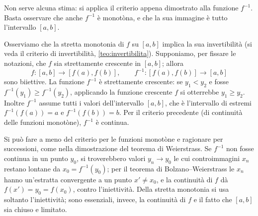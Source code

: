 \begin{strategia}
Non serve alcuna stima: si applica il criterio appena dimostrato alla funzione $f^{-1}$.
Basta osservare che anche $f^{-1}$ è monotòna, e che la sua immagine è tutto
l'intervallo $[a,b]$.
\end{strategia}

\begin{dimostrazione}
Osserviamo che la stretta monotonia di $f$ su $[a,b]$ implica la sua invertibilità (si
veda il criterio di invertibilità, \cref{teo:invertibilita}). Supponiamo, per fissare le
notazioni, che $f$ sia strettamente crescente in $[a,b]$; allora
\begin{equation}\label{eq:inversa-domini}
  f:[a,b]\to[f(a),f(b)], \qquad f^{-1}:[f(a),f(b)]\to[a,b]
\end{equation}
sono biiettive. La funzione $f^{-1}$ è strettamente crescente: se $y_{1}<y_{2}$ e fosse
$f^{-1}(y_{1})\ge f^{-1}(y_{2})$, applicando la funzione crescente $f$ si otterrebbe
$y_{1}\ge y_{2}$. Inoltre $f^{-1}$ assume tutti i valori dell'intervallo $[a,b]$, che è
l'intervallo di estremi $f^{-1}(f(a))=a$ e $f^{-1}(f(b))=b$. Per il criterio precedente
(di continuità delle funzioni monotòne), $f^{-1}$ è continua.
\end{dimostrazione}

\begin{strategia}
Si può fare a meno del criterio per le funzioni monotòne e ragionare per successioni,
come nella dimostrazione del teorema di Weierstrass. Se $f^{-1}$ non fosse continua in
un punto $y_{0}$, si troverebbero valori $y_{n}\to y_{0}$ le cui controimmagini $x_{n}$
restano lontane da $x_{0}=f^{-1}(y_{0})$; per il teorema di Bolzano--Weierstrass le
$x_{n}$ hanno un'estratta convergente a un punto $x'\neq x_{0}$, e la continuità di $f$
dà $f(x')=y_{0}=f(x_{0})$, contro l'iniettività. Della stretta monotonia si usa soltanto
l'iniettività; sono essenziali, invece, la continuità di $f$ e il fatto che $[a,b]$ sia
chiuso e limitato.
\end{strategia}


